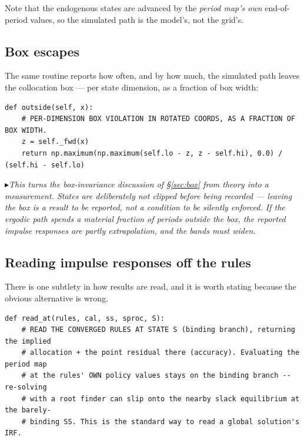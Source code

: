 \documentclass[11pt]{article}
\numberwithin{equation}{section}
\newcommand{\code}[1]{\texttt{\small #1}}
\theoremstyle{definition}
\theoremstyle{plain}
\theoremstyle{remark}
\newcommand{\trick}[1]{\par\smallskip\noindent
  \textcolor{notec}{$\blacktriangleright$}\;\emph{#1}\par\smallskip}
\begin{document}
Note that the endogenous states are advanced by the \emph{period map's own}
end-of-period values, so the simulated path is the model's, not the grid's.

\subsection{Box escapes}

The same routine reports how often, and by how much, the simulated path leaves the
collocation box --- per state dimension, as a fraction of box width:

\begin{lstlisting}[caption={Reporting box violations. \code{state\_grid.py} and \code{accuracy.py}.}]
def outside(self, x):
    # PER-DIMENSION BOX VIOLATION IN ROTATED COORDS, AS A FRACTION OF BOX WIDTH.
    z = self._fwd(x)
    return np.maximum(np.maximum(self.lo - z, z - self.hi), 0.0) / (self.hi - self.lo)
\end{lstlisting}

\trick{This turns the box-invariance discussion of \S\ref{sec:box} from theory into a
measurement. States are deliberately \emph{not} clipped before being recorded ---
leaving the box is a result to be reported, not a condition to be silently enforced.
If the ergodic path spends a material fraction of periods outside the box, the
reported impulse responses are partly extrapolation, and the bands must widen.}

\subsection{Reading impulse responses off the rules}

There is one subtlety in how results are read, and it is worth stating because the
obvious alternative is wrong.

\begin{lstlisting}[caption={Reading the solution, not re-solving it. \code{recursive\_experiment.py}, \code{read\_at}.}]
def read_at(rules, cal, ss, sproc, S):
    # READ THE CONVERGED RULES AT STATE S (binding branch), returning the implied
    # allocation + the point residual there (accuracy). Evaluating the period map
    # at the rules' OWN policy values stays on the binding branch -- re-solving
    # with a root finder can slip onto the nearby slack equilibrium at the barely-
    # binding SS. This is the standard way to read a global solution's IRF.
\end{lstlisting}
\end{document}
